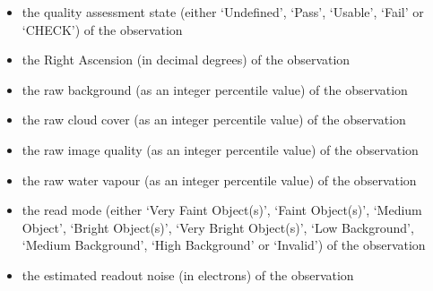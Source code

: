 \documentclass[letterpaper,10pt,english]{sphinxmanual}
\begin{document}
\begin{itemize}
\item {} 
the quality assessment state (either `Undefined', `Pass', `Usable', `Fail' or
`CHECK') of the observation

\end{itemize}

\begin{itemize}
\item {} 
the Right Ascension (in decimal degrees) of the observation

\end{itemize}

\begin{itemize}
\item {} 
the raw background (as an integer percentile value) of the observation

\end{itemize}

\begin{itemize}
\item {} 
the raw cloud cover (as an integer percentile value) of the observation

\end{itemize}

\begin{itemize}
\item {} 
the raw image quality (as an integer percentile value) of the observation

\end{itemize}

\begin{itemize}
\item {} 
the raw water vapour (as an integer percentile value) of the observation

\end{itemize}

\begin{itemize}
\item {} 
the read mode (either `Very Faint Object(s)', `Faint Object(s)', `Medium
Object', `Bright Object(s)', `Very Bright Object(s)', `Low Background',
`Medium Background', `High Background' or `Invalid') of the observation

\end{itemize}

\begin{itemize}
\item {} 
the estimated readout noise (in electrons) of the observation

\end{itemize}
\end{document}
